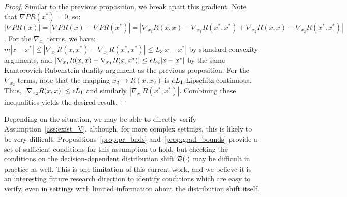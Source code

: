 \begin{proof}
Similar to the previous proposition, we break apart this gradient. Note that $\nabla PR(x^*) = 0$, so:
$|\nabla PR(x)| = |\nabla PR(x) - \nabla PR(x^*)| =
|\nabla_{x_1} R(x,x) - \nabla_{x_1} R(x^*,x^*) +
\nabla_{x_2} R(x,x) - \nabla_{x_2} R(x^*,x^*)|$. For the $\nabla_{x_1}$ terms, we have: $m|x-x^*| \le |\nabla_{x_1} R(x,x^*) - \nabla_{x_1}R(x^*,x^*)| \le L_3|x-x^*|$ by standard convexity arguments, and $|\nabla_{x_1} R(x,x) - \nabla_{x_1}R(x,x^*)| \le \epsilon L_4 |x-x^*|$ by the same Kantorovich-Rubenstein duality argument as the previous proposition. For the $\nabla_{x_2}$ terms, note that the mapping $x_2 \mapsto R(x,x_2)$ is $\epsilon L_1$ Lipschitz continuous. Thus, $|\nabla_{x_2} R(x,x)| \le \epsilon L_1$ and similarly $|\nabla_{x_2} R(x^*,x^*)|$. Combining these inequalities yields the desired result.
\end{proof}

Depending on the situation, we may be able to directly verify Assumption~\ref{ass:exist_V}, although, for more complex settings, this is likely to be very difficult. Propositions~\ref{prop:pr_bnds} and~\ref{prop:grad_bounds} provide a set of sufficient conditions for this assumption to hold, but checking the conditions on the decision-dependent distribution shift $\mathcal{D}(\cdot)$ may be difficult in practice as well. This is one limitation of this current work, and we believe it is an interesting future research direction to identify conditions which are easy to verify, even in settings with limited information about the distribution shift itself.
